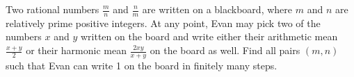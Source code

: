Two rational numbers \(\tfrac{m}{n}\) and \(\tfrac{n}{m}\) are written on a blackboard, where \(m\) and \(n\) are relatively prime positive integers. At any point, Evan may pick two of the numbers \(x\) and \(y\) written on the board and write either their arithmetic mean \(\tfrac{x+y}{2}\) or their harmonic mean \(\tfrac{2xy}{x+y}\) on the board as well. Find all pairs \((m,n)\) such that Evan can write 1 on the board in finitely many steps.